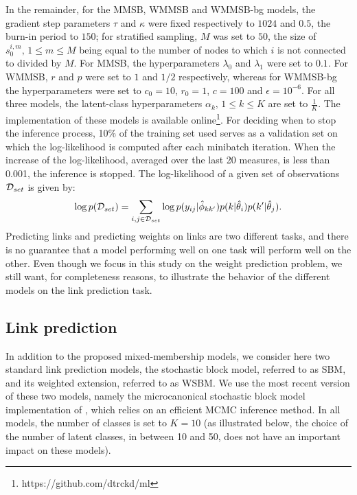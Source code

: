 In the remainder, for the MMSB, WMMSB and WMMSB-bg models, the gradient step parameters  $\tau$ and $\kappa$ were fixed respectively to  $1024$ and $0.5$, the burn-in period to $150$; for stratified sampling, $M$ was set to $50$, the size of $s_0^{i,m}, \, 1 \le m \le M$ being equal to the number of nodes to which $i$ is not connected to divided by $M$. For MMSB, the hyperparameters $\lambda_0$ and $\lambda_1$ were set to $0.1$. For WMMSB, $r$ and $p$ were set to $1$ and $1/2$ respectively, whereas for WMMSB-bg the hyperparameters were set to  $c_0=10$, $r_0=1$, $c=100$ and $\epsilon=10^{-6}$. For all three models, the latent-class hyperparameters $\alpha_k, \, 1 \le k \le K$ are set to $\frac{1}{K}$. The implementation of these models is available online\footnote{https://github.com/dtrckd/ml}. For deciding when to stop the inference process, 10\% of the training set used serves as a validation set on which the log-likelihood is computed after each minibatch iteration. When the increase of the log-likelihood, averaged over the last 20 measures, is less than 0.001, the inference is stopped. The log-likelihood of a given set of observations $\mathcal{D}_{set}$  is given by:
%
\begin{align*}
\log p(\mathcal{D}_{set}) = \sum_{i,j \in \mathcal{D}_{set}} \log p(y_{ij} | \hat\phi_{kk'}) p(k|\hat\theta_i) p(k'|\hat\theta_j).
\end{align*}
%
Predicting links and predicting weights on links are two different tasks, and there is no guarantee that a model performing well on one task will perform well on the other. Even though we focus in this study on the weight prediction problem, we still want, for completeness reasons, to illustrate the behavior of the different models on the link prediction task.

\subsection{Link prediction}

\begin{table*}[t]
\centering
	
\label{table:roc}
\end{table*}

In addition to the proposed mixed-membership models, we consider here two standard link prediction models, the stochastic block model, referred to as SBM, and its weighted extension, referred to as WSBM. We use the most recent version of these two models, namely the microcanonical stochastic block model implementation of \cite{peixoto2018nonparametric}, which relies on an efficient MCMC inference method. In all models, the number of classes is set to $K=10$ (as illustrated below, the choice of the number of latent classes, in between 10 and 50, does not have an important impact on these models).

